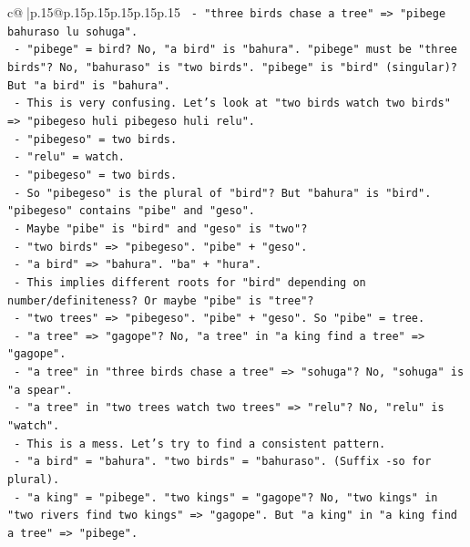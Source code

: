 \documentclass{article}
\begin{document}
{\begin{supertabular}{c@{$\;$}|p{.15\linewidth}@{}p{.15\linewidth}p{.15\linewidth}p{.15\linewidth}p{.15\linewidth}p{.15\linewidth}}
{{{\texttt{                    {-} "three birds chase a tree" => "pibege bahuraso lu sohuga".} \\
\texttt{                      {-} "pibege" = bird? No, "a bird" is "bahura". "pibege" must be "three birds"? No, "bahuraso" is "two birds". "pibege" is "bird" (singular)? But "a bird" is "bahura".} \\
\texttt{                      {-} This is very confusing. Let's look at "two birds watch two birds" => "pibegeso huli pibegeso huli relu".} \\
\texttt{                        {-} "pibegeso" = two birds.} \\
\texttt{                        {-} "relu" = watch.} \\
\texttt{                        {-} "pibegeso" = two birds.} \\
\texttt{                        {-} So "pibegeso" is the plural of "bird"? But "bahura" is "bird". "pibegeso" contains "pibe" and "geso".} \\
\texttt{                        {-} Maybe "pibe" is "bird" and "geso" is "two"?} \\
\texttt{                        {-} "two birds" => "pibegeso". "pibe" + "geso".} \\
\texttt{                        {-} "a bird" => "bahura". "ba" + "hura".} \\
\texttt{                        {-} This implies different roots for "bird" depending on number/definiteness? Or maybe "pibe" is "tree"?} \\
\texttt{                        {-} "two trees" => "pibegeso". "pibe" + "geso". So "pibe" = tree.} \\
\texttt{                        {-} "a tree" => "gagope"? No, "a tree" in "a king find a tree" => "gagope".} \\
\texttt{                        {-} "a tree" in "three birds chase a tree" => "sohuga"? No, "sohuga" is "a spear".} \\
\texttt{                        {-} "a tree" in "two trees watch two trees" => "relu"? No, "relu" is "watch".} \\
\texttt{                        {-} This is a mess. Let's try to find a consistent pattern.} \\
\texttt{                        {-} "a bird" = "bahura". "two birds" = "bahuraso". (Suffix {-}so for plural).} \\
\texttt{                        {-} "a king" = "pibege". "two kings" = "gagope"? No, "two kings" in "two rivers find two kings" => "gagope". But "a king" in "a king find a tree" => "pibege".} \\
}}}
\end{supertabular}}
\end{document}
